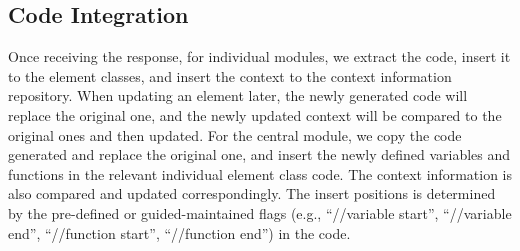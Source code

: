 

\subsection{Code Integration}
Once receiving the response, for individual module{s}, we extract the code, insert it to the element classes{, and insert} %
the context to the context information repository. When updating {an} element later, the newly generated code will replace the original one, and the newly updated context will be compared to the original ones and then {updated}. %
For the central module, we copy the code generated and replace the original {one}, %
and insert the newly defined variables and functions in the relevant individual element class code. The context information is also compared and updated correspondingly. The insert positions is determined by the pre-defined or guided-maintained flags (e.g., ``//variable start'', ``//variable end'', ``//function start'', ``//function end'') in the code.

